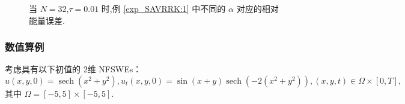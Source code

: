 \documentclass[aspectratio=169]{beamer}
\numberwithin{theorem}{section} %
\begin{document}
\begin{frame}%
	\begin{figure}[H]
		\begin{center}
		\caption{当 $N=32$,$\tau=0.01$ 时,例 \ref{exp_SAVRRK:1} 中不同的 $\alpha$ 对应的相对能量误差.}
		\label{fig_SAVRRK:4-2}
		\end{center}
		\end{figure}
\end{frame}
\begin{frame}\frametitle{数值算例}
	\begin{example}\label{exp_SAVRRK:2}
		考虑具有以下初值的 2维 NFSWEs：
		\begin{equation*}
		u(x, y, 0)=\operatorname{sech}\left(x^2+y^2\right), u_t(x, y, 0)=\sin (x+y) \operatorname{sech}\left(-2\left(x^2+y^2\right)\right),(x, y, t) \in \Omega \times[0, T],
		\end{equation*}
		其中 $\Omega=[-5,5] \times[-5,5]$.
		\end{example}
\end{frame}
\end{document}
